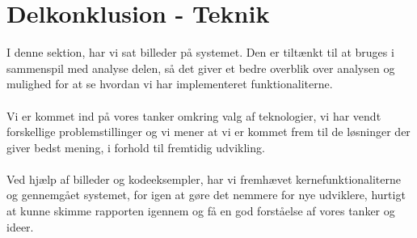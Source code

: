 \section{Delkonklusion - Teknik}
I denne sektion, har vi sat billeder på systemet. Den er tiltænkt til at bruges i sammenspil med analyse delen, så det  giver et bedre overblik over analysen og mulighed for at se
hvordan vi har implementeret funktionaliterne.
\\\\
Vi er kommet ind på vores tanker omkring valg af teknologier, vi har vendt forskellige problemstillinger og vi mener at vi er kommet frem til de løsninger der giver bedst mening, i forhold til fremtidig udvikling.
\\\\
Ved hjælp af billeder og kodeeksempler, har vi fremhævet kernefunktionaliterne og gennemgået systemet, for igen at gøre det nemmere for nye udviklere, hurtigt at kunne skimme rapporten igennem og få en god forståelse af vores tanker og ideer.
